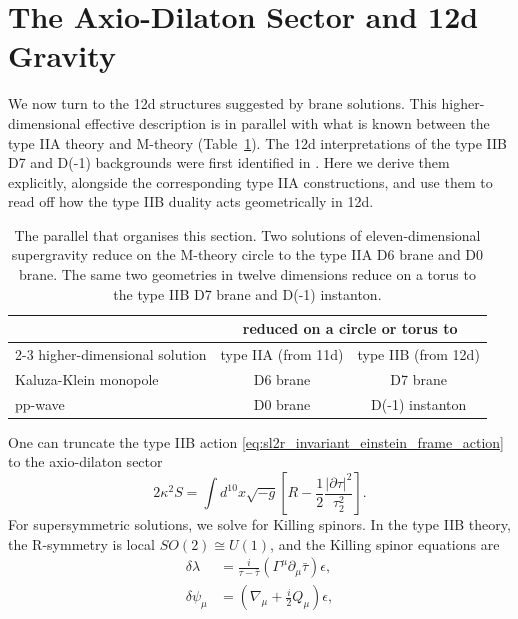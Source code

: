 \section{The Axio-Dilaton Sector and 12d Gravity}
\label{sec:axio-dilaton-12d}
We now turn to the 12d structures suggested by brane solutions.
This higher-dimensional effective description is in parallel with what is known between the type IIA theory and M-theory (Table~\ref{tab:iia-iib-uplift}).
The 12d interpretations of the type IIB D7 and D(-1) backgrounds were first identified in \cite{Vafa:1996xn,Tseytlin:1996ne}. Here we derive them explicitly, alongside the corresponding type IIA constructions, and use them to read off how the type IIB \SLZ{} duality acts geometrically in 12d.

\begin{table}[ht]
\centering
\begin{tabular}{lcc}
\toprule
 & \multicolumn{2}{c}{reduced on a circle or torus to}\\
\cmidrule(l){2-3}
higher-dimensional solution & type IIA (from 11d) & type IIB (from 12d)\\
\midrule
Kaluza-Klein monopole & D6 brane & D7 brane\\
pp-wave               & D0 brane & D(-1) instanton\\
\bottomrule
\end{tabular}
\caption{The parallel that organises this section. 
Two solutions of eleven-dimensional supergravity reduce on the M-theory circle to the type IIA D6 brane and D0 brane. 
The same two geometries in twelve dimensions reduce on a torus to the type IIB D7 brane and D(-1) instanton.}
\label{tab:iia-iib-uplift}
\end{table}
One can truncate the type IIB action \eqref{eq:sl2r_invariant_einstein_frame_action} to the axio-dilaton sector
\begin{equation}
2\kappa^2S=
\int d^{10}x\sqrt{-g}\left[
R-\frac{1}{2}\frac{|\partial \tau|^2}{\tau_2^2}
\right].
\label{IIB axio-dilaton action}
\end{equation}
For supersymmetric solutions, we solve for Killing spinors.
In the type IIB theory, the R-symmetry is local $SO(2)\cong U(1)$, and the Killing spinor equations are \cite{Bergshoeff:2006jj}
\begin{equation}
\begin{aligned}
\delta\lambda
&=\frac{i}{\tau-\bar\tau}(\Gamma^\mu\partial_\mu \bar\tau)\epsilon,\\
\delta\psi_\mu
&=
\left(\nabla_\mu+\frac{i}{2}Q_\mu\right)\epsilon,
\end{aligned}
\label{9+1 IIB axio-dilaton Killing spinor equations}
\end{equation}
